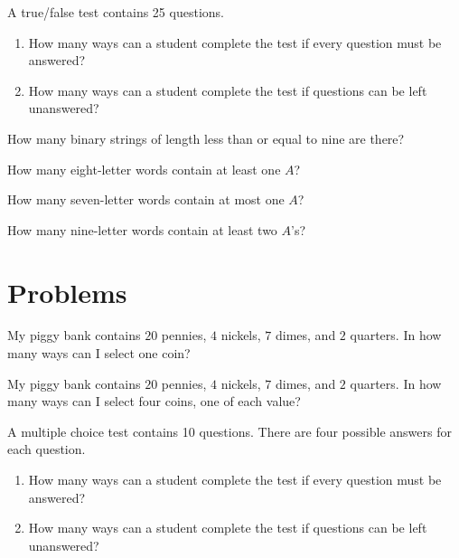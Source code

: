 \begin{exer}
A true/false test contains 25 questions. 
\begin{enumerate}[label=(\alph*)]
 \item How many ways can a student complete the test if every question 
 must be answered?
 
 \item How many ways can a student complete the test if questions 
 can be left unanswered?
\end{enumerate}
\end{exer}

\begin{exer}
How many binary strings of length less than or equal to nine are there?
\end{exer}

\begin{exer}
How many eight-letter words contain at least one $A$?
\end{exer}

\begin{exer}
How many seven-letter words contain at most one $A$?
\end{exer}

\begin{exer}
How many nine-letter words contain at least two $A$'s?
\end{exer}

\section{Problems}

\begin{prob}
My piggy bank contains $20$ pennies, $4$ nickels, $7$ dimes, and $2$ quarters. In how many ways can I select one coin?
\end{prob}

\begin{prob}
My piggy bank contains $20$ pennies, $4$ nickels, $7$ dimes, and $2$ quarters. In how many ways can I select four coins, one of each value?
\end{prob}

\begin{prob}
A multiple choice test contains 10 questions. There are four possible answers
for each question.
\begin{enumerate}[label=(\alph*)]
 \item How many ways can a student complete the test if every question 
 must be answered?
 
 \item How many ways can a student complete the test if questions 
 can be left unanswered?
\end{enumerate}
\end{prob}

